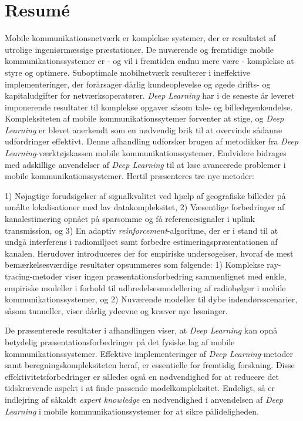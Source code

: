 \chapter*{Resumé}
Mobile kommunikationsnetværk er komplekse systemer, der er resultatet af utrolige ingeniørmæssige præstationer. De nuværende og fremtidige mobile kommunikationssystemer er - og vil i fremtiden endnu mere være - komplekse at styre og optimere. Suboptimale mobilnetværk resulterer i ineffektive implementeringer, der forårsager dårlig kundeoplevelse og øgede drifts- og kapitaludgifter for netværksoperatører. \emph{Deep Learning} har i de seneste år leveret imponerende resultater til komplekse opgaver såsom tale- og billedegenkendelse. Kompleksiteten af mobile kommunikationssytemer forventer at stige, og \emph{Deep Learning} er blevet anerkendt som en nødvendig brik til at overvinde sådanne udfordringer effektivt. 
Denne afhandling udforsker brugen af metodikker fra \emph{Deep Learning}-værktøjskassen mobile kommunikationssystemer. Endvidere bidrages med adskillige anvendelser af \emph{Deep Learning} til at løse avancerede problemer i mobile kommunikationssystemer. Hertil præsenteres tre nye metoder:

1) Nøjagtige forudsigelser af signalkvalitet ved hjælp af geografiske billeder på umålte lokalisationer med lav datakompleksitet, 2) Væsentlige forbedringer af kanalestimering opnået på sparsomme og få referencesignaler i uplink transmission, og 3) En adaptiv \emph{reinforcement}-algoritme, der er i stand til at undgå interferens i radiomiljøet samt forbedre estimeringspræsentationen af kanalen. Herudover introduceres der for empiriske undersøgelser, hvoraf de mest bemærkelsesværdige resultater opsummeres som følgende: 1) Komplekse ray-tracing-metoder viser ingen præsentationsforbedring sammenlignet med enkle, empiriske modeller i forhold til udbredelsesmodellering af radiobølger i mobile kommunikationssystemer, og 2) Nuværende modeller til dybe indendørsscenarier, såsom tunneller, viser dårlig ydeevne og kræver nye løsninger.

De præsenterede resultater i afhandlingen viser, at \emph{Deep Learning} kan opnå betydelig præsentationsforbedringer på det fysiske lag af mobile kommunikationssystemer. Effektive implementeringer af \emph{Deep Learning}-metoder samt beregningskompleksiteten heraf, er essentielle for fremtidig forskning. Disse effektivitetsforbedringer er således også en nødvendighed for at reducere det tidskrævende aspekt i at finde passende modelkompleksitet. Endeligt, så er indlejring af såkaldt \emph{expert knowledge} en nødvendighed i anvendelsen af \emph{Deep Learning} i mobile kommunikationssystemer for at sikre pålideligheden.